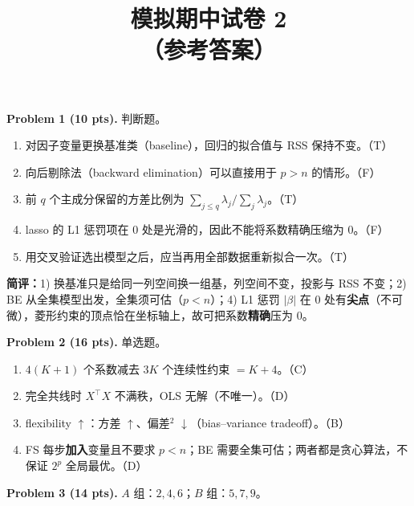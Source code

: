 \documentclass[11pt]{ctexart}
\title{\textbf{模拟期中试卷 2}\\[0.2em]
\large （参考答案）}
\author{}
\date{}
\newcommand{\ans}[1]{{\color{red}#1}}
\begin{document}
\maketitle
\vspace{-1.2cm}

\noindent\textbf{Problem 1 (10 pts).} 判断题。
\begin{enumerate}
\item 对因子变量更换基准类（baseline），回归的拟合值与 RSS 保持不变。\hfill\ans{（T）}
\item 向后剔除法（backward elimination）可以直接用于 $p > n$ 的情形。\hfill\ans{（F）}
\item 前 $q$ 个主成分保留的方差比例为 $\sum_{j \leq q}\lambda_j \big/ \sum_j \lambda_j$。\hfill\ans{（T）}
\item lasso 的 L1 惩罚项在 $0$ 处是光滑的，因此不能将系数精确压缩为 $0$。\hfill\ans{（F）}
\item 用交叉验证选出模型之后，应当再用全部数据重新拟合一次。\hfill\ans{（T）}
\end{enumerate}

\ans{\textbf{简评：}1) 换基准只是给同一列空间换一组基，列空间不变，投影与 RSS 不变；2) BE 从全集模型出发，全集须可估（$p < n$）；4) L1 惩罚 $|\beta|$ 在 $0$ 处有\textbf{尖点}（不可微），菱形约束的顶点恰在坐标轴上，故可把系数\textbf{精确}压为 $0$。}

\noindent\textbf{Problem 2 (16 pts).} 单选题。
\begin{enumerate}
\item $4(K{+}1)$ 个系数减去 $3K$ 个连续性约束 $= K+4$。\hfill\ans{（C）}
\item 完全共线时 $X^{\top}X$ 不满秩，OLS 无解（不唯一）。\hfill\ans{（D）}
\item flexibility $\uparrow$：方差 $\uparrow$、偏差$^2$ $\downarrow$（bias--variance tradeoff）。\hfill\ans{（B）}
\item FS 每步\textbf{加入}变量且不要求 $p<n$；BE 需要全集可估；两者都是贪心算法，不保证 $2^p$ 全局最优。\hfill\ans{（D）}
\end{enumerate}

\noindent\textbf{Problem 3 (14 pts).} $A$ 组：$2, 4, 6$；$B$ 组：$5, 7, 9$。
\end{document}
